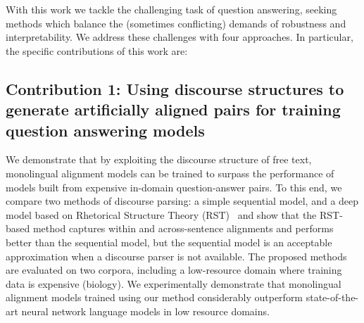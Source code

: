 With this work we tackle the challenging task of question answering, seeking methods which balance the (sometimes conflicting) demands of robustness and interpretability.  We  address these challenges with four approaches.  In particular, the specific contributions of this work are:


\subsection{Contribution 1: Using discourse structures to generate artificially aligned pairs for training question answering models} 
We demonstrate that by exploiting the discourse structure of free text, monolingual alignment models can be trained to surpass the performance of models built from expensive in-domain question-answer pairs.  To this end, we compare two methods of discourse parsing: a simple sequential model, and a deep model based on Rhetorical Structure Theory (RST)~\citep{mann88} and show that the RST-based method captures within and across-sentence alignments and performs better than the sequential model, but the sequential model is an acceptable approximation when a discourse parser is not available.  The proposed methods are evaluated on two corpora, including a low-resource domain where training data is expensive (biology). We experimentally demonstrate that monolingual alignment models trained using our method considerably outperform state-of-the-art neural network language models in low resource domains.

